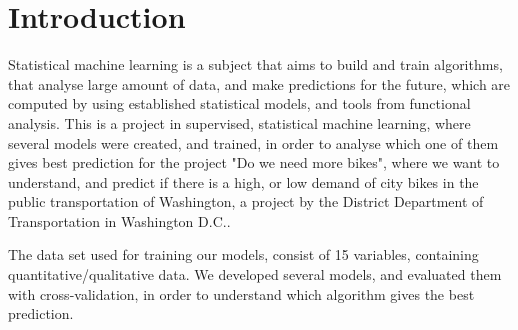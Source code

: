 \section{Introduction}
Statistical machine learning is a subject that aims to build and train algorithms, that analyse large amount of data, and make predictions for the future, which are computed by using established statistical models, and tools from functional analysis. This is a project in supervised, statistical machine learning, where several models were created, and trained, in order to analyse which one of them gives best prediction for the project "Do we need more bikes", where we want to understand, and predict if there is a high, or low demand of city bikes in the public transportation of Washington, a project by the District Department of Transportation in Washington D.C..

The data set used for training our models, consist of 15 variables, containing quantitative/qualitative data. We developed several models, and evaluated them with cross-validation, in order to understand which algorithm gives the best prediction. 